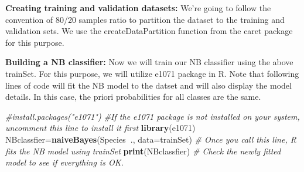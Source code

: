 \documentclass[]{article}
\newenvironment{Shaded}{\begin{snugshade}}{\end{snugshade}}
\newcommand{\CommentTok}[1]{\textcolor[rgb]{0.56,0.35,0.01}{\textit{#1}}}
\newcommand{\DataTypeTok}[1]{\textcolor[rgb]{0.13,0.29,0.53}{#1}}
\newcommand{\FloatTok}[1]{\textcolor[rgb]{0.00,0.00,0.81}{#1}}
\newcommand{\KeywordTok}[1]{\textcolor[rgb]{0.13,0.29,0.53}{\textbf{#1}}}
\newcommand{\NormalTok}[1]{#1}
\newcommand{\OperatorTok}[1]{\textcolor[rgb]{0.81,0.36,0.00}{\textbf{#1}}}
\newcommand{\OtherTok}[1]{\textcolor[rgb]{0.56,0.35,0.01}{#1}}
\newcommand{\StringTok}[1]{\textcolor[rgb]{0.31,0.60,0.02}{#1}}
\begin{document}
\textbf{Creating training and validation datasets:} We're going to
follow the convention of 80/20 samples ratio to partition the dataset to
the training and validation sets. We use the createDataPartition
function from the caret package for this purpose.

\begin{Shaded}
\end{Shaded}

\textbf{Building a NB classifier:} Now we will train our NB classiﬁer
using the above trainSet. For this purpose, we will utilize e1071
package in R. Note that following lines of code will fit the NB model to
the datset and will also display the model details. In this case, the
priori probabilities for all classes are the same.

\begin{Shaded}
\begin{Highlighting}[]
\CommentTok{#install.packages("e1071") #If the e1071 package is not installed on your system, uncomment this line to install it first}
\KeywordTok{library}\NormalTok{(e1071)}
\NormalTok{NBclassfier=}\KeywordTok{naiveBayes}\NormalTok{(Species}\OperatorTok{~}\NormalTok{., }\DataTypeTok{data=}\NormalTok{trainSet) }\CommentTok{# Once you call this line, R fits the NB model using trainSet}
\KeywordTok{print}\NormalTok{(NBclassfier) }\CommentTok{# Check the newly fitted model to see if everything is OK.}
\end{Highlighting}
\end{Shaded}
\end{document}
